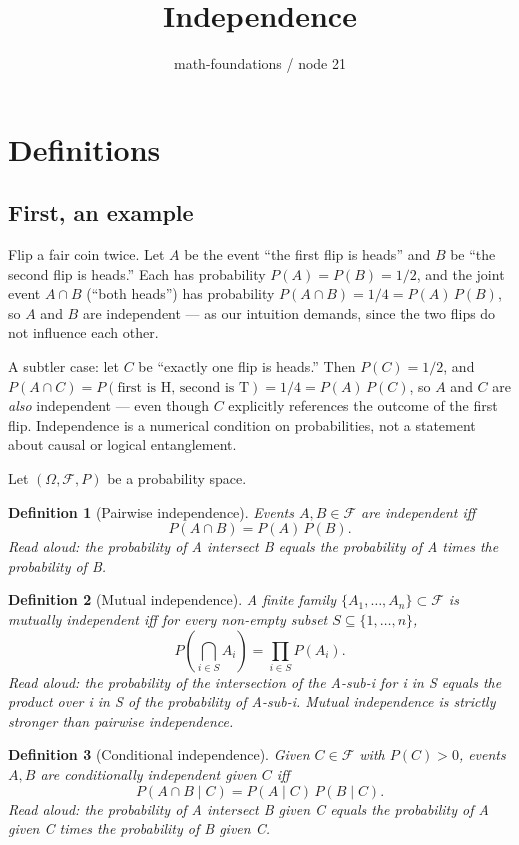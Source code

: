 \documentclass[11pt]{article}
\title{Independence}
\author{math-foundations / node 21}
\date{}
\newtheorem{definition}{Definition}
\begin{document}
\maketitle

\section{Definitions}

\subsection*{First, an example}
Flip a fair coin twice. Let $A$ be the event ``the first flip is heads'' and $B$ be ``the second flip is heads.''
Each has probability $P(A) = P(B) = 1/2$, and the joint event $A \cap B$ (``both heads'') has probability
$P(A \cap B) = 1/4 = P(A)\, P(B)$, so $A$ and $B$ are independent --- as our intuition demands, since the two flips
do not influence each other.

A subtler case: let $C$ be ``exactly one flip is heads.'' Then $P(C) = 1/2$, and
$P(A \cap C) = P(\text{first is H, second is T}) = 1/4 = P(A)\, P(C)$, so $A$ and $C$ are \emph{also} independent ---
even though $C$ explicitly references the outcome of the first flip. Independence is a numerical condition on
probabilities, not a statement about causal or logical entanglement.

Let $(\Omega, \mathcal{F}, P)$ be a probability space.

\begin{definition}[Pairwise independence]
Events $A, B \in \mathcal{F}$ are \emph{independent} iff
\[
P(A \cap B) = P(A)\, P(B).
\]
\emph{Read aloud:} the probability of A intersect B equals the probability of A times the probability of B.
\end{definition}

\begin{definition}[Mutual independence]
A finite family $\{A_1, \dots, A_n\} \subset \mathcal{F}$ is \emph{mutually independent} iff for every
non-empty subset $S \subseteq \{1, \dots, n\}$,
\[
P\!\left( \bigcap_{i \in S} A_i \right) = \prod_{i \in S} P(A_i).
\]
\emph{Read aloud:} the probability of the intersection of the A-sub-i for i in S equals the product over i in S of the probability of A-sub-i.
Mutual independence is strictly stronger than pairwise independence.
\end{definition}

\begin{definition}[Conditional independence]
Given $C \in \mathcal{F}$ with $P(C) > 0$, events $A, B$ are \emph{conditionally independent given} $C$ iff
\[
P(A \cap B \mid C) = P(A \mid C)\, P(B \mid C).
\]
\emph{Read aloud:} the probability of A intersect B given C equals the probability of A given C times the probability of B given C.
\end{definition}
\end{document}
